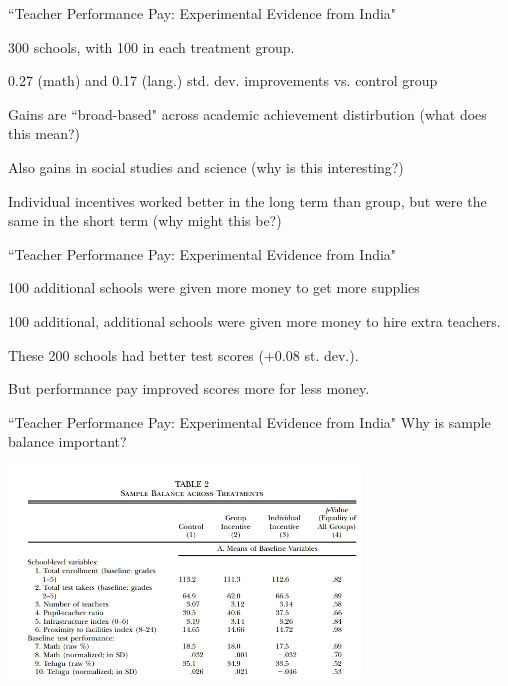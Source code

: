 \documentclass[aspectratio=169,usenames,dvipsnames]{beamer}
\newenvironment{wideitemize}{\itemize\addtolength{\itemsep}{10pt}}{\enditemize}
\begin{document}
\begin{frame}{``Teacher Performance Pay: Experimental Evidence from India"}
    \begin{wideitemize}
        \item 300 schools, with 100 in each treatment group.
        \item 0.27 (math) and 0.17 (lang.) std. dev. improvements vs. control group
        \item Gains are ``broad-based" across academic achievement distirbution (what does this mean?)
        \item Also gains in social studies and science (why is this interesting?)
        \item Individual incentives worked better in the long term than group, but were the same in the short term (why might this be?)
    \end{wideitemize}
\end{frame}

\begin{frame}{``Teacher Performance Pay: Experimental Evidence from India"}
    \begin{wideitemize}
        \item 100 additional schools were given more money to get more supplies
        \item 100 additional, additional schools were given more money to hire extra teachers.
        \item These 200 schools had better test scores (+0.08 st. dev.).
        \item But performance pay improved scores more for less money.
    \end{wideitemize}
\end{frame}




\begin{frame}{``Teacher Performance Pay: Experimental Evidence from India"}
Why is sample balance important?

    \includegraphics[width=0.7\textwidth]{pictures/balance_teachers.png}
\end{frame}
\end{document}
